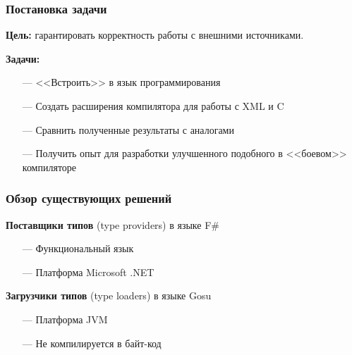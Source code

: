 \documentclass[12pt]{beamer}
\newcommand{\nl}{\vspace{\baselineskip}}
\begin{document}
\begin{frame}\frametitle{Постановка задачи}
\begin{large}
    \linespread{1}
    \textbf{Цель:} гарантировать корректность работы с внешними источниками.

    \textbf{Задачи:}
    \begin{itemize}
        \item[---] {<<Встроить>>} в язык программирования
        \item[---] Создать расширения компилятора для работы с XML и C
        \item[---] Сравнить полученные результаты с аналогами
        \item[---] Получить опыт для разработки улучшенного подобного в {<<боевом>>} компиляторе
    \end{itemize}


    \linespread{1}
\end{large}
\end{frame}

\begin{frame}\frametitle{Обзор существующих решений} %
\begin{large}
    \textbf{Поставщики типов} (type providers) в языке F\#
    \begin{itemize}
        \item[---] Функциональный язык
        \item[---] Платформа Microsoft .NET
    \end{itemize}
    \nl
    \textbf{Загрузчики типов} (type loaders) в языке Gosu
    \begin{itemize}
        \item[---] Платформа JVM
        \item[---] Не компилируется в байт-код
    \end{itemize}
\end{large}
\end{frame}
\end{document}
